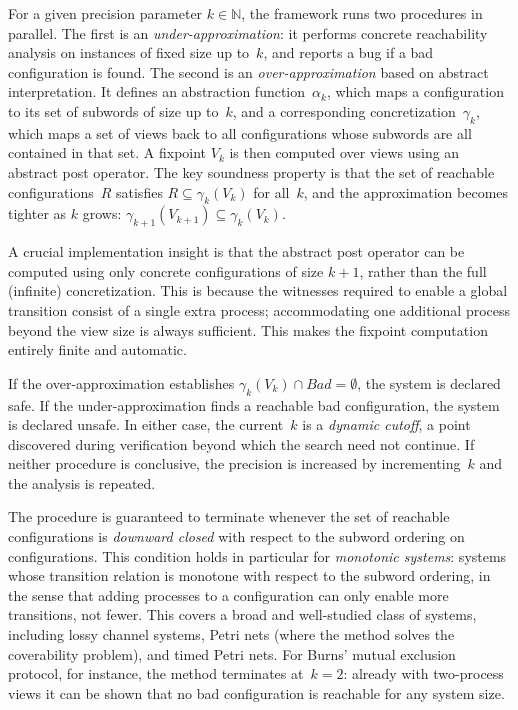 For a given precision parameter $k \in \mathbb{N}$, the framework runs two
procedures in parallel. The first is an \emph{under-approximation}: it
performs concrete reachability analysis on instances of fixed size up to~$k$,
and reports a bug if a bad configuration is found. The second is an
\emph{over-approximation} based on abstract interpretation. It defines an
abstraction function~$\alpha_k$, which maps a configuration to its set of
subwords of size up to~$k$, and a corresponding concretization~$\gamma_k$,
which maps a set of views back to all configurations whose subwords are all
contained in that set. A fixpoint $V_k$ is then computed over views using an
abstract post operator. The key soundness property is that the set of
reachable configurations~$R$ satisfies $R \subseteq \gamma_k(V_k)$ for
all~$k$, and the approximation becomes tighter as $k$ grows:
$\gamma_{k+1}(V_{k+1}) \subseteq \gamma_k(V_k)$.

A crucial implementation insight is that the abstract post operator can be
computed using only concrete configurations of size $k{+}1$, rather than the
full (infinite) concretization. This is because the witnesses required to
enable a global transition consist of a single extra process; accommodating
one additional process beyond the view size is always sufficient. This makes
the fixpoint computation entirely finite and automatic.

If the over-approximation establishes $\gamma_k(V_k) \cap \mathit{Bad} =
\emptyset$, the system is declared safe. If the under-approximation finds a
reachable bad configuration, the system is declared unsafe. In either case,
the current~$k$ is a \emph{dynamic cutoff}, a point discovered during
verification beyond which the search need not continue. If neither procedure
is conclusive, the precision is increased by incrementing~$k$ and the
analysis is repeated.

The procedure is guaranteed to terminate whenever the set of reachable
configurations is \emph{downward closed} with respect to the subword ordering
on configurations. This condition holds in particular for \emph{monotonic
systems}: systems whose transition relation is monotone with respect to the
subword ordering, in the sense that adding processes to a configuration can
only enable more transitions, not fewer. This covers a broad and well-studied
class of systems, including lossy channel systems, Petri nets (where the
method solves the coverability problem), and timed Petri nets. For Burns'
mutual exclusion protocol, for instance, the method terminates at~$k = 2$:
already with two-process views it can be shown that no bad configuration is
reachable for any system size.

